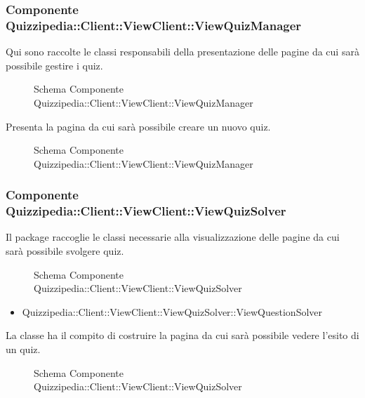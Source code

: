 \subsubsection{Componente Quizzipedia::Client::ViewClient::ViewQuizManager}
Qui sono raccolte le classi responsabili della presentazione delle pagine da cui sarà possibile gestire i quiz.
\begin{figure}[H]
\centering
\noindent{}
\caption{Schema Componente Quizzipedia::Client::ViewClient::ViewQuizManager}
\end{figure}
Presenta la pagina da cui sarà possibile creare un nuovo quiz.
\begin{figure}[H]
\centering
\noindent{}
\caption{Schema Componente Quizzipedia::Client::ViewClient::ViewQuizManager}
\end{figure}
\subsubsection{Componente Quizzipedia::Client::ViewClient::ViewQuizSolver}
Il package raccoglie le classi necessarie alla visualizzazione delle pagine da cui sarà possibile svolgere quiz.
\begin{figure}[H]
\centering
\noindent{}
\caption{Schema Componente Quizzipedia::Client::ViewClient::ViewQuizSolver}
\end{figure}
\begin{itemize}
\item Quizzipedia::Client::ViewClient::ViewQuizSolver::ViewQuestionSolver
\end{itemize}
La classe ha il compito di costruire la pagina da cui sarà possibile vedere l'esito di un quiz.
\begin{figure}[H]
\centering
\noindent{}
\caption{Schema Componente Quizzipedia::Client::ViewClient::ViewQuizSolver}
\end{figure}
